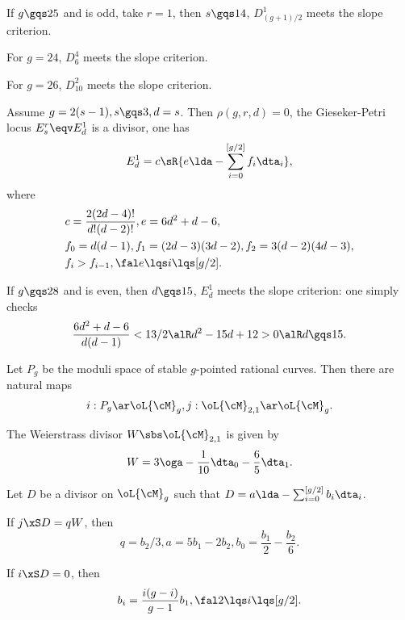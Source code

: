 \documentclass[a4paper, twoside]{article}
\begin{document}
\begin{cor}
	If $g\gqs25$ and is odd, take $r=1$, then $s\gqs14$, $D_{(g+1)/2}^{1}$ meets the slope criterion.

	For $g=24$, $D_{6}^{4}$ meets the slope criterion.

	For $g=26$, $D_{10}^{2}$ meets the slope criterion.
\end{cor}


\begin{thm}
	Assume $g=2(s-1), s\gqs3, d=s$. Then $\rho(g,r,d)=0$, the Gieseker-Petri locus $E_{s}^{r}\eqv E_{d}^{1}$ is a divisor, one has
	\[
		E_{d}^{1}=c\sR{e\lda-\sum_{i=0}^{[g/2]}f_{i}\dta_{i}},
	\]
	where
	\begin{align*}
	  &c=\frac{2(2d-4)!}{d!(d-2)!}, e=6d^{2}+d-6,\\
	  &f_{0}=d(d-1), f_{1}=(2d-3)(3d-2), f_{2}=3(d-2)(4d-3),\\
	  &f_{i}>f_{i-1}, \fal e\lqs i\lqs [g/2].
	\end{align*}
\end{thm}

\begin{cor}
	If $g\gqs28$ and is even, then $d\gqs15$, $E_{d}^{1}$ meets the slope criterion: one simply checks
	\[
		\frac{6d^{2}+d-6}{d(d-1)}<13/2\alR d^{2}-15d+12>0\alR d\gqs15.
	\]
\end{cor}

\begin{stp}
	Let $P_{g}$ be the moduli space of stable $g$-pointed rational curves. Then there are natural maps
	\[
		i:P_{g}\ar\oL{\cM}_{g}, j:\oL{\cM}_{2,1}\ar\oL{\cM}_{g}.
	\]
\end{stp}


\begin{thm}[Theorem~2.2]
	The Weierstrass divisor $W\sbs\oL{\cM}_{2,1}$ is given by
	\[
		W=3\oga-\frac{1}{10}\dta_{0}-\frac{6}{5}\dta_{1}.
	\]
\end{thm}

\begin{thm}
	Let $D$ be a divisor on $\oL{\cM}_{g}$ such that $D=a\lda-\sum_{i=0}^{[g/2]}b_{i}\dta_{i}$.
	\begin{enr}
		\item If $j\xS D=qW$, then
		\[
			q=b_{2}/3, a=5b_{1}-2b_{2}, b_{0}=\frac{b_{1}}{2}-\frac{b_{2}}{6}.
		\]
		\item If $i\xS D=0$, then
		\[
			b_{i}=\frac{i(g-i)}{g-1}b_{1}, \fal 2\lqs i\lqs [g/2].
		\]
	\end{enr}
\end{thm}
\end{document}
